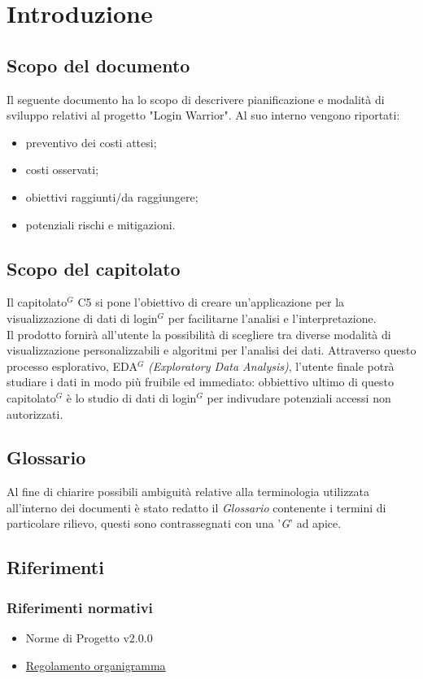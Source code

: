 \section{Introduzione}
\subsection{Scopo del documento}
Il seguente documento ha lo scopo di descrivere pianificazione e modalità di sviluppo relativi al progetto "Login Warrior".
Al suo interno vengono riportati:
\begin{itemize}
    \item preventivo dei costi attesi;
    \item costi osservati;
    \item obiettivi raggiunti/da raggiungere;
    \item potenziali rischi e mitigazioni.
\end{itemize} 

\subsection{Scopo del capitolato}
Il capitolato$^{G}$ C5 si pone l'obiettivo di creare un'applicazione per la visualizzazione di dati di login$^{G}$ 
per facilitarne l'analisi e l'interpretazione.\\ 
Il prodotto fornirà all'utente la possibilità di scegliere tra diverse
modalità di visualizzazione personalizzabili e algoritmi per l'analisi dei dati. 
Attraverso questo processo esplorativo, EDA$^{G}$ \textit{(Exploratory Data Analysis)},
l'utente finale potrà studiare i dati in modo più fruibile ed immediato: obbiettivo ultimo 
di questo capitolato$^{G}$ è lo studio di dati di login$^{G}$ per indivudare potenziali accessi non autorizzati.

\subsection{Glossario}
Al fine di chiarire possibili ambiguità relative alla terminologia utilizzata all'interno dei documenti è stato redatto il \textit{Glossario} contenente i termini di particolare rilievo,
questi sono contrassegnati con una '\textit{G}' ad apice. 

\subsection{Riferimenti}
\subsubsection{Riferimenti normativi}
\begin{itemize}
    \item Norme di Progetto v2.0.0
    \item \href{https://www.math.unipd.it/~tullio/IS-1/2021/Progetto/Capitolati.html}{Regolamento organigramma}
\end{itemize}
